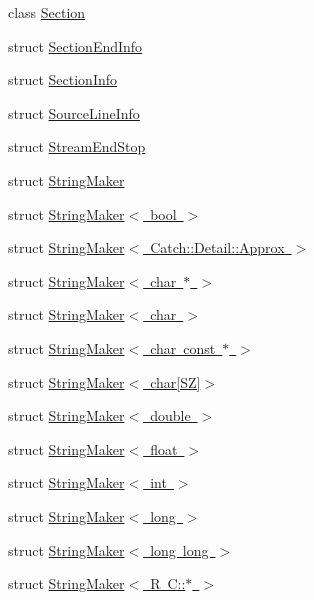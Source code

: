 \begin{DoxyCompactItemize}
\item 
class \mbox{\hyperlink{class_catch_1_1_section}{Section}}
\item 
struct \mbox{\hyperlink{struct_catch_1_1_section_end_info}{Section\+End\+Info}}
\item 
struct \mbox{\hyperlink{struct_catch_1_1_section_info}{Section\+Info}}
\item 
struct \mbox{\hyperlink{struct_catch_1_1_source_line_info}{Source\+Line\+Info}}
\item 
struct \mbox{\hyperlink{struct_catch_1_1_stream_end_stop}{Stream\+End\+Stop}}
\item 
struct \mbox{\hyperlink{struct_catch_1_1_string_maker}{String\+Maker}}
\item 
struct \mbox{\hyperlink{struct_catch_1_1_string_maker_3_01bool_01_4}{String\+Maker$<$ bool $>$}}
\item 
struct \mbox{\hyperlink{struct_catch_1_1_string_maker_3_01_catch_1_1_detail_1_1_approx_01_4}{String\+Maker$<$ Catch\+::\+Detail\+::\+Approx $>$}}
\item 
struct \mbox{\hyperlink{struct_catch_1_1_string_maker_3_01char_01_5_01_4}{String\+Maker$<$ char $\ast$ $>$}}
\item 
struct \mbox{\hyperlink{struct_catch_1_1_string_maker_3_01char_01_4}{String\+Maker$<$ char $>$}}
\item 
struct \mbox{\hyperlink{struct_catch_1_1_string_maker_3_01char_01const_01_5_01_4}{String\+Maker$<$ char const $\ast$ $>$}}
\item 
struct \mbox{\hyperlink{struct_catch_1_1_string_maker_3_01char[_s_z]_4}{String\+Maker$<$ char\mbox{[}\+S\+Z\mbox{]}$>$}}
\item 
struct \mbox{\hyperlink{struct_catch_1_1_string_maker_3_01double_01_4}{String\+Maker$<$ double $>$}}
\item 
struct \mbox{\hyperlink{struct_catch_1_1_string_maker_3_01float_01_4}{String\+Maker$<$ float $>$}}
\item 
struct \mbox{\hyperlink{struct_catch_1_1_string_maker_3_01int_01_4}{String\+Maker$<$ int $>$}}
\item 
struct \mbox{\hyperlink{struct_catch_1_1_string_maker_3_01long_01_4}{String\+Maker$<$ long $>$}}
\item 
struct \mbox{\hyperlink{struct_catch_1_1_string_maker_3_01long_01long_01_4}{String\+Maker$<$ long long $>$}}
\item 
struct \mbox{\hyperlink{struct_catch_1_1_string_maker_3_01_r_01_c_1_1_5_01_4}{String\+Maker$<$ R C\+::$\ast$ $>$}}
\item 

\end{DoxyCompactItemize}
